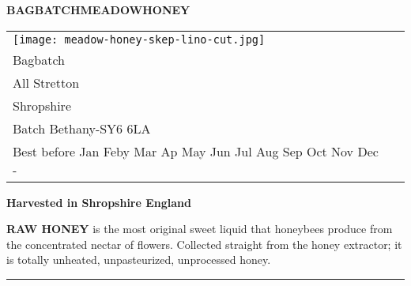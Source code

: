 \documentclass[10pt, a4paper]{letter}
\newcommand{\MONTH}{%
  \ifcase\the\month
  \or Jan%
  \or Feby%
  \or Mar%
  \or Ap%
  \or May%
  \or Jun%
  \or Jul%
  \or Aug%
  \or Sep%
  \or Oct%
  \or Nov%
  \or Dec%
  \fi}
\begin{document}
\setlength{\parskip}{1em}

\newcommand\honeylabel{%
{\fontsize{15.5pt}{20pt}\selectfont  \textbf{BAGBATCH\hfil MEADOW\hfil HONEY}} 
  \begin{tabular}{ll}%
    \begin{minipage}{2cm}%
      \texttt{[image: meadow-honey-skep-lino-cut.jpg]}
    \end{minipage}%
    &
    \begin{minipage}{4.5cm}
     \par
      454g 1lb \hfill Joe Collins\\
      \footnotesize\strut\hfill Bagbatch\\
      \strut\hfill All Stretton\\
      \strut\hfill  Shropshire\\
      Batch Bethany-\the\month \hfill SY6 6LA\\
      \AdvanceDate[730]%
      Best before \MONTH-\the\year{} \hfill\strut 
    \end{minipage}
  \end{tabular}
{\fontsize{14pt}{20pt}\selectfont  \textbf{Harvested in Shropshire England}}
}%

\begin{labels}
%
{%
  \honeylabel
  
}%
\end{labels}

\LeftLabelBorder=5mm%
\RightLabelBorder=5mm%
\TopLabelBorder=5mm%
\BottomLabelBorder=5mm%
\LabelSetup%
\newcommand\rawlabel{%
  \small
  {\bf RAW HONEY} is the most original sweet liquid that honeybees produce from the concentrated nectar of flowers. 
   Collected straight from the honey extractor; it is totally unheated, unpasteurized, unprocessed honey.\vfill
}%

\begin{labels}
%
{%
  \rawlabel
  
}%
\end{labels}


\LeftPageMargin=0mm
\LabelSetup
\setlength{\parskip}{1em}
%
{%
  \rule{\paperwidth}{3pt}\par\par
}%
\end{document}
